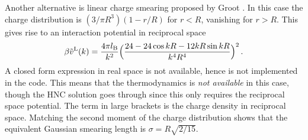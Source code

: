 \documentclass[12pt,a4paper]{article}
\newcommand{\lr}{^{\mathrm{L}}}
\begin{document}
Another alternative is linear charge smearing proposed by Groot
\cite{Groot03}.  In this case the charge distribution is $(3/\pi
R^3)(1-r/R)$ for $r<R$, vanishing for $r>R$. This gives rise to an
interaction potential in reciprocal space \cite{WV14}
%
\begin{equation}
\beta {\tilde v}\lr(k)=\frac{4\pi\lB}{k^2}
\Bigl(\frac{24-24\cos kR-12kR\sin kR}{k^4R^4}\Bigr)^2\,.
\end{equation}
%
A closed form expression in real space is not available, hence is not
implemented in the code.  This means that the thermodynamics is
\emph{not available} in this case, though the HNC solution goes
through since this only requires the reciprocal space potential.  The
term in large brackets is the charge density in reciprocal space.
Matching the second moment of the charge distribution \cite{WV14}
shows that the equivalent Gaussian smearing length is
$\sigma=R\sqrt{2/15}$.
\end{document}

